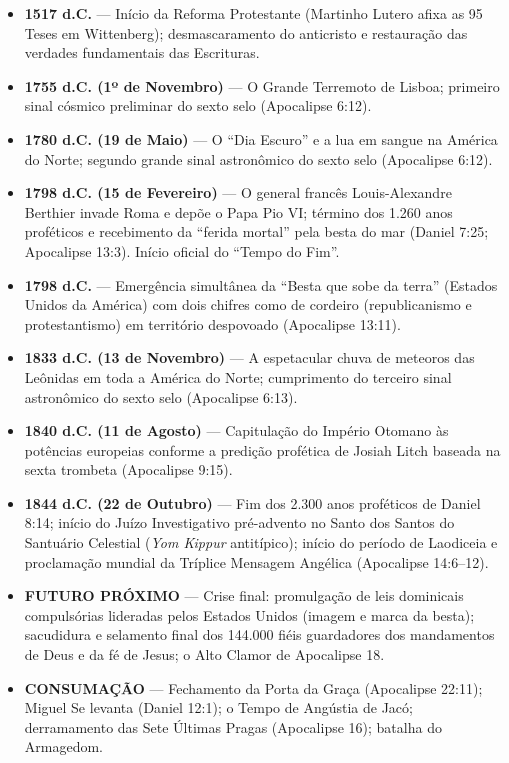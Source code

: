 \documentclass[11pt,a4paper,openany]{book}
\begin{document}
\begin{itemize}
    \item \textbf{1517 d.C.} --- Início da Reforma Protestante (Martinho Lutero afixa as 95 Teses em Wittenberg); desmascaramento do anticristo e restauração das verdades fundamentais das Escrituras.
    \item \textbf{1755 d.C. (1º de Novembro)} --- O Grande Terremoto de Lisboa; primeiro sinal cósmico preliminar do sexto selo (Apocalipse 6:12).
    \item \textbf{1780 d.C. (19 de Maio)} --- O ``Dia Escuro'' e a lua em sangue na América do Norte; segundo grande sinal astronômico do sexto selo (Apocalipse 6:12).
    \item \textbf{1798 d.C. (15 de Fevereiro)} --- O general francês Louis-Alexandre Berthier invade Roma e depõe o Papa Pio VI; término dos 1.260 anos proféticos e recebimento da ``ferida mortal'' pela besta do mar (Daniel 7:25; Apocalipse 13:3). Início oficial do ``Tempo do Fim''.
    \item \textbf{1798 d.C.} --- Emergência simultânea da ``Besta que sobe da terra'' (Estados Unidos da América) com dois chifres como de cordeiro (republicanismo e protestantismo) em território despovoado (Apocalipse 13:11).
    \item \textbf{1833 d.C. (13 de Novembro)} --- A espetacular chuva de meteoros das Leônidas em toda a América do Norte; cumprimento do terceiro sinal astronômico do sexto selo (Apocalipse 6:13).
    \item \textbf{1840 d.C. (11 de Agosto)} --- Capitulação do Império Otomano às potências europeias conforme a predição profética de Josiah Litch baseada na sexta trombeta (Apocalipse 9:15).
    \item \textbf{1844 d.C. (22 de Outubro)} --- Fim dos 2.300 anos proféticos de Daniel 8:14; início do Juízo Investigativo pré-advento no Santo dos Santos do Santuário Celestial (\textit{Yom Kippur} antitípico); início do período de Laodiceia e proclamação mundial da Tríplice Mensagem Angélica (Apocalipse 14:6--12).
    \item \textbf{FUTURO PRÓXIMO} --- Crise final: promulgação de leis dominicais compulsórias lideradas pelos Estados Unidos (imagem e marca da besta); sacudidura e selamento final dos 144.000 fiéis guardadores dos mandamentos de Deus e da fé de Jesus; o Alto Clamor de Apocalipse 18.
    \item \textbf{CONSUMAÇÃO} --- Fechamento da Porta da Graça (Apocalipse 22:11); Miguel Se levanta (Daniel 12:1); o Tempo de Angústia de Jacó; derramamento das Sete Últimas Pragas (Apocalipse 16); batalha do Armagedom.

\end{itemize}
\end{document}
